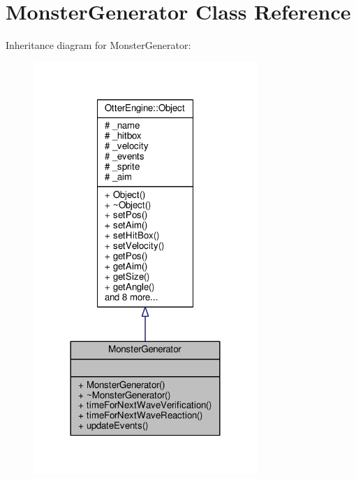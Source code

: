 \hypertarget{class_monster_generator}{}\section{Monster\+Generator Class Reference}
\label{class_monster_generator}


Inheritance diagram for Monster\+Generator\+:\nopagebreak
\begin{figure}[H]
\begin{center}
\leavevmode
\includegraphics[width=240pt]{d4/d1e/class_monster_generator__inherit__graph}
\end{center}
\end{figure}


